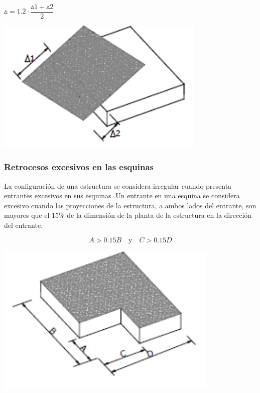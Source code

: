\documentclass{report}
\begin{document}
\begin{center}
    \begin{minipage}{0.4\textwidth}
        \centering
        $\vartriangle = 1.2 \cdot \dfrac{\vartriangle 1 + \vartriangle 2}{2}$
    \end{minipage}%
    \begin{minipage}{0.4\textwidth}
        \centering
        \includegraphics[width=0.75\textwidth]{imagenes/irregularidad_torsional.png}
    \end{minipage}
\end{center}

\subsubsection{Retrocesos excesivos en las esquinas }
La configuraci\'on de una estructura se considera irregular cuando presenta entrantes excesivos en sus esquinas. 
Un entrante en una esquina se considera excesivo cuando las proyecciones de la estructura, a ambos lados del entrante, 
son mayores que el 15\% de la dimensi\'on de la planta de la estructura en la direcci\'on del entrante.

\begin{center}
    \begin{minipage}{0.4\textwidth}
        \centering
        $$A > 0.15B \quad \text{y} \quad C > 0.15D$$
    \end{minipage}%
    \begin{minipage}{0.4\textwidth}
        \centering
        \includegraphics[width=0.8\textwidth]{imagenes/retrocesos_excesivos_en_las_esquinas.png}
    \end{minipage}
\end{center}
\end{document}
